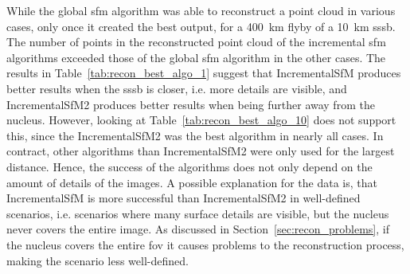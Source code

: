 \begin{table}[htb]
    \centering
    \caption{\Gls{sfm} algorithm with most reconstructed points for each scenario with a \SI{10}{\kilo\meter} \gls{sssb}. Seq1 refers to algorithm IncrementalSfM, Seq2 refers to algorithm IncrementalSfM2 and Glob refers to algorithm GlobalSfM.}
    \label{tab:recon_best_algo_10}
\end{table}


While the global \gls{sfm} algorithm was able to reconstruct a point cloud in various cases, only once it created the best output, for a \SI{400}{\kilo\meter} flyby of a \SI{10}{\kilo\meter} \gls{sssb}. The number of points in the reconstructed point cloud of the incremental \gls{sfm} algorithms exceeded those of the global \gls{sfm} algorithm in the other cases.
The results in Table~\ref{tab:recon_best_algo_1} suggest that IncrementalSfM produces better results when the \gls{sssb} is closer, i.e. more details are visible, and IncrementalSfM2 produces better results when being further away from the nucleus. However, looking at Table~\ref{tab:recon_best_algo_10} does not support this, since the IncrementalSfM2 was the best algorithm in nearly all cases. In contract, other algorithms than IncrementalSfM2 were only used for the largest distance. Hence, the success of the algorithms does not only depend on the amount of details of the images. A possible explanation for the data is, that IncrementalSfM is more successful than IncrementalSfM2 in well-defined scenarios, i.e. scenarios where many surface details are visible, but the nucleus never covers the entire image. As discussed in Section~\ref{sec:recon_problems}, if the nucleus covers the entire \gls{fov} it causes problems to the reconstruction process, making the scenario less well-defined.